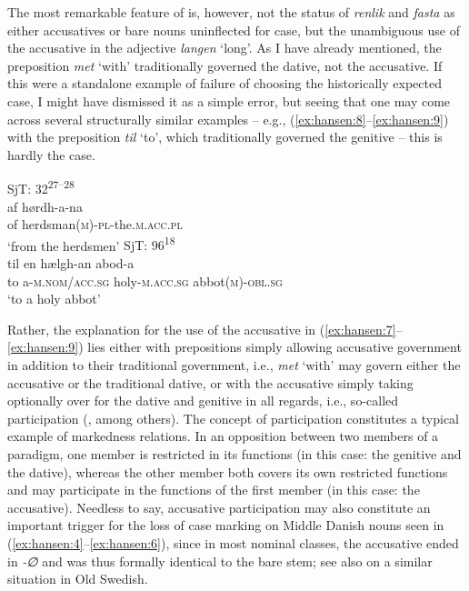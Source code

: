\documentclass[output=paper]{langsci/langscibook}
\begin{document}
The most remarkable feature of  is, however, not the status of \textit{renlik} and \textit{fasta} as either accusatives or bare nouns uninflected for case, but the unambiguous use of the accusative in the adjective \textit{langen} ‘long’. As I have already mentioned, the preposition \textit{met} ‘with’ traditionally governed the dative, not the accusative. If this were a standalone example of failure of choosing the historically expected case, I might have dismissed it as a simple error, but seeing that one may come across several structurally similar examples – e.g., (\ref{ex:hansen:8}--\ref{ex:hansen:9}) with the preposition \textit{til} ‘to’, which traditionally governed the genitive – this is hardly the case.

\ea \label{ex:hansen:8}
{SjT: 32\textsuperscript{27–28}} \\ 
\gll af hørdh-a-na\\
     of herdsman(\textsc{m)-pl-}the\textsc{.m.acc.pl}\\
\glt ‘from the herdsmen’
\ex \label{ex:hansen:9} 
{SjT: 96\textsuperscript{18}} \\ 
\gll til en hælgh-an abod-a\\
     to a\textsc{{}-}\textsc{m.nom/acc.sg} holy\textsc{{}-m.acc.sg} abbot\textsc{(m)-obl.sg}\\
\glt ‘to a holy abbot’
\z 

Rather, the explanation for the use of the accusative in (\ref{ex:hansen:7}--\ref{ex:hansen:9}) lies either with prepositions simply allowing accusative government in addition to their traditional government, i.e., \textit{met} ‘with’ may govern either the accusative or the traditional dative, or with the accusative simply taking optionally over for the dative and genitive in all regards, i.e., so-called participation (\cites{Hjelmslev1935}[87]{Hjelmslev1970}[8–10, 38–40]{Bjerrum1966}[46]{Andersen2001}[16–18]{Heltoft2010}{Jensen2012}, among others). The concept of participation constitutes a typical example of markedness relations. In an opposition between two members of a paradigm, one member is restricted in its functions (in this case: the genitive and the dative), whereas the other member both covers its own restricted functions and may participate in the functions of the first member (in this case: the accusative). Needless to say, accusative participation may also constitute an important trigger for the loss of case marking on Middle Danish nouns seen in (\ref{ex:hansen:4}--\ref{ex:hansen:6}), since in most nominal classes, the accusative ended in \textit{{}-∅} and was thus formally identical to the bare stem; see also \citet[250--251]{Norde2001} on a similar situation in Old Swedish. 
\end{document}
